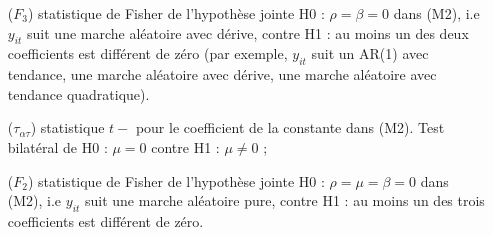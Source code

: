 \documentclass{article}
\begin{document}
\begin{itemize}
\item[($F_3$)] statistique de Fisher de l'hypoth\`ese jointe
H0 : $\rho=\beta=0$ dans (M2), i.e $y_{it}$ suit une marche
al\'eatoire avec d\'erive, contre H1 : au moins un des deux
coefficients est diff\'erent de z\'ero (par exemple, $y_{it}$ suit
un AR(1) avec tendance, une marche al\'eatoire avec d\'erive, une
marche al\'eatoire avec tendance quadratique).

\item[($\tau_{\alpha\tau}$)]
statistique $t-$ pour le coefficient de la constante dans (M2). Test
bilat\'eral de H0 : $\mu=0$ contre H1 : $\mu\not=0$ ;

\item[($F_2$)] statistique de Fisher de l'hypoth\`ese jointe
H0 : $\rho=\mu=\beta=0$ dans (M2), i.e $y_{it}$ suit une marche
al\'eatoire pure, contre H1 : au moins un des trois coefficients est
diff\'erent de z\'ero.
\end{itemize}
\end{document}
